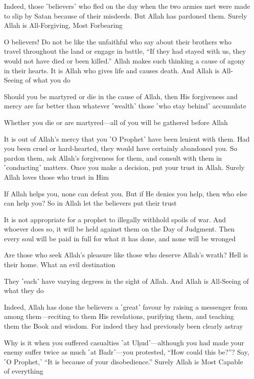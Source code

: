 Indeed, those ˹believers˺ who fled on the day when the two armies met were made to slip by Satan because of their misdeeds. But Allah has pardoned them. Surely Allah is All-Forgiving, Most Forbearing

O believers! Do not be like the unfaithful who say about their brothers who travel throughout the land or engage in battle, “If they had stayed with us, they would not have died or been killed.” Allah makes such thinking a cause of agony in their hearts. It is Allah who gives life and causes death. And Allah is All-Seeing of what you do

Should you be martyred or die in the cause of Allah, then His forgiveness and mercy are far better than whatever ˹wealth˺ those ˹who stay behind˺ accumulate

Whether you die or are martyred—all of you will be gathered before Allah

It is out of Allah’s mercy that you ˹O Prophet˺ have been lenient with them. Had you been cruel or hard-hearted, they would have certainly abandoned you. So pardon them, ask Allah’s forgiveness for them, and consult with them in ˹conducting˺ matters. Once you make a decision, put your trust in Allah. Surely Allah loves those who trust in Him

If Allah helps you, none can defeat you. But if He denies you help, then who else can help you? So in Allah let the believers put their trust

It is not appropriate for a prophet to illegally withhold spoils of war. And whoever does so, it will be held against them on the Day of Judgment. Then every soul will be paid in full for what it has done, and none will be wronged

Are those who seek Allah’s pleasure like those who deserve Allah’s wrath? Hell is their home. What an evil destination

They ˹each˺ have varying degrees in the sight of Allah. And Allah is All-Seeing of what they do

Indeed, Allah has done the believers a ˹great˺ favour by raising a messenger from among them—reciting to them His revelations, purifying them, and teaching them the Book and wisdom. For indeed they had previously been clearly astray

Why is it when you suffered casualties ˹at Uḥud˺—although you had made your enemy suffer twice as much ˹at Badr˺—you protested, “How could this be?”? Say, ˹O Prophet,˺ “It is because of your disobedience.” Surely Allah is Most Capable of everything

